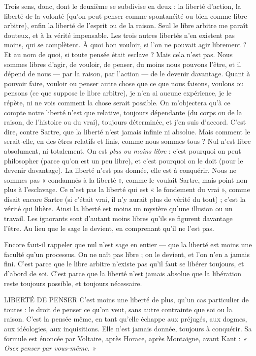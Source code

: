 {Trois sens, donc, dont le deuxième se subdivise en deux : la liberté d’action,
la liberté de la volonté (qu’on peut penser comme spontanéité ou bien comme
libre arbitre), enfin la liberté de l’esprit ou de la raison. Seul le libre arbitre me
paraît douteux, et à la vérité impensable. Les trois autres libertés n’en existent
pas moins, qui se complètent. À quoi bon vouloir, si l’on ne pouvait agir
librement ? Et au nom de quoi, si toute pensée était esclave ? Mais cela n’est
pas. Nous sommes libres d’agir, de vouloir, de penser, du moins nous pouvons
l'être, et il dépend de nous — par la raison, par l’action — de le devenir davantage.
Quant à pouvoir faire, vouloir ou penser autre chose que ce que nous faisons,
voulons ou pensons (ce que suppose le libre arbitre), je n’en ai aucune
expérience, je le répète, ni ne vois comment la chose serait possible. On
m'objectera qu’à ce compte notre liberté n’est que relative, toujours dépendante
(du corps ou de la raison, de l’histoire ou du vrai), toujours déterminée,
et j'en suis d’accord. C’est dire, contre Sartre, que la liberté n’est jamais infinie
ni absolue. Mais comment le serait-elle, en des êtres relatifs et finis, comme
nous sommes tous ? Nul n’est libre absolument, ni totalement. On est {\it plus ou
moins libre} : c’est pourquoi on peut philosopher (parce qu’on est un peu libre),
et c’est pourquoi on le doit (pour le devenir davantage). La liberté n’est pas
donnée, elle est à conquérir. Nous ne sommes pas « condamnés à la liberté »,
comme le voulait Sartre, mais point non plus à l'esclavage. Ce n’est pas la
liberté qui est « le fondement du vrai », comme disait encore Sartre (si c'était
vrai, il n’y aurait plus de vérité du tout) ; c’est la vérité qui libère. Ainsi la
liberté est moins un mystère qu’une illusion ou un travail. Les ignorants sont
d'autant moins libres qu'ils se figurent davantage l’être. Au lieu que le sage le
devient, en comprenant qu’il ne l’est pas.

Encore faut-il rappeler que nul n’est sage en entier — que la liberté est
moins une faculté qu’un processus. On ne naît pas libre ; on le devient, et l’on
n’en a jamais fini. C’est parce que le libre arbitre n’existe pas qu’il faut se libérer
toujours, et d’abord de soi. C’est parce que la liberté n’est jamais absolue que
la libération reste toujours possible, et toujours nécessaire.

LIBERTÉ DE PENSER C’est moins une liberté de plus, qu’un cas particulier
de toutes : le droit de penser ce qu’on veut,
sans autre contrainte que soi ou la raison. C’est la pensée même, en tant qu’elle
échappe aux préjugés, aux dogmes, aux idéologies, aux inquisitions. Elle n’est
jamais donnée, toujours à conquérir. Sa formule est énoncée par Voltaire, après
Horace, après Montaigne, avant Kant : {\it « Osez penser par vous-même. »}

}
